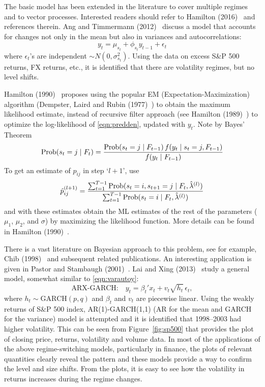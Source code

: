 The basic model has been extended in the literature to cover multiple regimes and to vector processes. Interested readers should refer to Hamilton (2016)~\cite{jdham} and references therein. Ang and Timmermann (2012)~\cite{timmerman} discuss a model that accounts for changes not only in the mean but also in variances and autocorrelations:
	\begin{equation} \label{eqn:varautoy}
	y_t= \mu_{s_t} + \phi_{s_t} y_{t-1} + \epsilon_t
	\end{equation}
where $\epsilon_t$'s are independent $\sim N(0,\sigma_{s_t}^2)$. Using the data on excess S\&P 500 returns, FX returns, etc., it is identified that there are volatility regimes, but no level shifts.


Hamilton (1990)~\cite{90ham} proposes using the popular EM (Expectation-Maximization) algorithm (Dempster, Laird and Rubin (1977)~\cite{dempster}) to obtain the maximum likelihood estimate, instead of recursive filter approach (see Hamilton (1989)~\cite{89ham}) to optimize the log-likelihood of \eqref{eqn:predden}, updated with $y_t$. Note by Bayes' Theorem
	\begin{equation} \label{eqn:bayes}
	\Prob(s_t= j \;|\; F_t) = \dfrac{\Prob(s_t= j \;|\; F_{t-1}) \, f(y_t\;|\; s_t=j, F_{t-1})}{f(y_t \;|\; F_{t-1})}
	\end{equation}
To get an estimate of $p_{ij}$ in step `$l+1$', use 
	\begin{equation}\label{eqn:hatpijl}
	\hat{p}_{ij}^{(l+1)}= \dfrac{\sum_{t=1}^{T-1} \Prob(s_t= i, s_{t+1}= j \;|\; F_t, \hat{\lambda}^{(l)})}{\sum_{t=1}^{T-1} \Prob(s_t= i \;|\; F_t, \hat{\lambda}^{(l)})}
	\end{equation}
and with these estimates obtain the ML estimates of the rest of the parameters ($\mu_1$, $\mu_2$, and $\sigma$) by maximizing the likelihood function. More details can be found in Hamilton (1990)~\cite{90ham}.


There is a vast literature on Bayesian approach to this problem, see for example, Chib (1998)~\cite{chib} and subsequent related publications. An interesting application is given in Pastor and Stambaugh (2001)~\cite{pastor}. Lai and Xing (2013)~\cite{laixing} study a general model, somewhat similar to \eqref{eqn:varautoy}:
	\begin{equation} \label{eqn:arxgarch}
	\text{ARX-GARCH:} \quad y_t= \beta_t' x_t + v_t \sqrt{h_t} \, \epsilon_t,
	\end{equation}
where $h_t \sim \text{GARCH}(p,q)$ and $\beta_t$ and $v_t$ are piecewise linear. Using the weakly returns of S\&P 500 index, AR(1)-GARCH(1,1) (AR for the mean and GARCH for the variance) model is attempted and it is identified that 1998--2003 had higher volatility. This can be seen from Figure~\ref{fig:sp500} that provides the plot of closing price, returns, volatility and volume data. In most of the applications of the above regime-switching models, particularly in finance, the plots of relevant quantities clearly reveal the pattern and these models provide a way to confirm the level and size shifts. From the plots, it is easy to see how the volatility in returns increases during the regime changes. 


